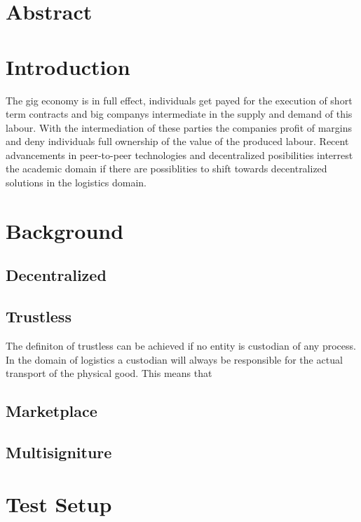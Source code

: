 \documentclass[Nomencl]{SelimArticle}
\begin{document}
\mytitlepage
\tableofcontents
\newpage

\section{Abstract}

\section{Introduction}

The gig economy is in full effect, individuals get payed for the execution of short term contracts and big companys intermediate in the supply and demand of this labour. With the intermediation of these parties the companies profit of margins and deny individuals full ownership of the value of the produced labour. Recent advancements in peer-to-peer technologies and decentralized posibilities interrest the academic domain if there are possiblities to shift towards decentralized solutions in the logistics domain\cite{research_demand}\cite{research_demand}\cite{research_demand}.\par

\section{Background}

\subsection{Decentralized}

\subsection{Trustless}

The definiton of trustless can be achieved if no entity is custodian of any process. In the domain of logistics a custodian will always be responsible for the actual transport of the physical good. This means that

\subsection{Marketplace}

\subsection{Multisigniture}


\section{Test Setup}
\end{document}
